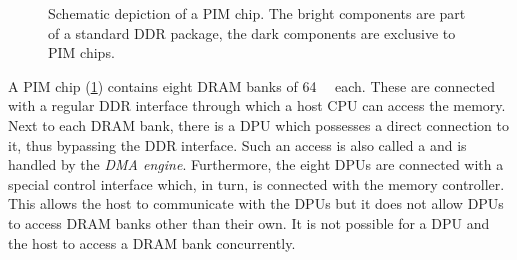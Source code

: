 \begin{figure}

	\caption{
		Schematic depiction of a \ac{PIM} chip.
		The bright components are part of a standard \ac{DDR} package, the dark components are exclusive to \ac{PIM} chips.~\cite{upmem2019HotChips}
	}
	\label{fig:arch:chip}
\end{figure}

A \ac{PIM} chip (\cref{fig:arch:chip}) contains eight \ac{DRAM} banks of \qty{64}{\mebi\byte} each.
These are connected with a regular \ac{DDR} interface through which a host \ac{CPU} can access the memory.
Next to each \ac{DRAM} bank, there is a \ac{DPU} which possesses a direct connection to it, thus bypassing the \ac{DDR} interface.
Such an access is also called a  and is handled by the \emph{\ac{DMA} engine}.
Furthermore, the eight \acp{DPU} are connected with a special control interface which, in turn, is connected with the memory controller.
This allows the host to communicate with the \acp{DPU} but it does not allow \acp{DPU} to access \ac{DRAM} banks other than their own.
It is not possible for a \ac{DPU} and the host to access a \ac{DRAM} bank concurrently.

